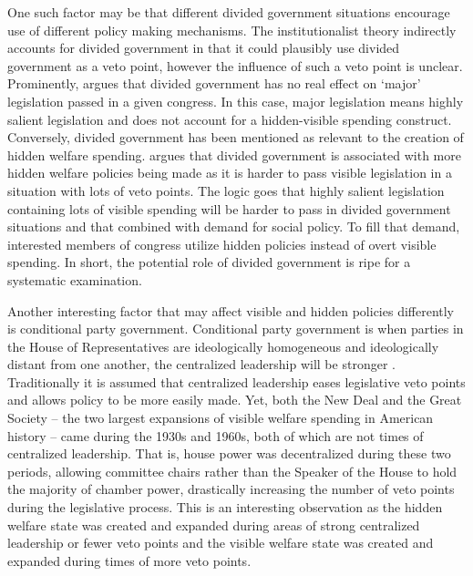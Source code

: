 \documentclass[12pt]{article}
\begin{document}
One such factor may be that different divided government situations encourage use of different policy making mechanisms.  The institutionalist theory indirectly accounts for divided government in that it could plausibly use divided government as a veto point, however the influence of such a veto point is unclear. Prominently, \cite{mayhew1990} argues that divided government has no real effect on `major' legislation passed in a given congress. In this case, major legislation means highly salient legislation and does not account for a hidden-visible spending construct. Conversely, divided government has been mentioned as relevant to the creation of hidden welfare spending. \citet[Ch. 4]{howard2008} argues that divided government is associated with more hidden welfare policies being made as it is harder to pass visible legislation in a situation with lots of veto points. The logic goes that highly salient legislation containing lots of visible spending will be harder to pass in divided government situations and that combined with demand for social policy. To fill that demand, interested members of congress utilize hidden policies instead of overt visible spending. In short, the potential role of divided government is ripe for a systematic examination.

Another interesting factor that may affect visible and hidden policies differently is conditional party government. Conditional party government is when parties in the House of Representatives are ideologically homogeneous and ideologically distant from one another, the centralized leadership will be stronger \cite{rohde1991}. Traditionally it is assumed that centralized leadership eases legislative veto points and allows policy to be more easily made. Yet, both the New Deal and the Great Society -- the two largest expansions of visible welfare spending in American history -- came during the 1930s and 1960s, both of which are not times of centralized leadership. That is, house power was decentralized during these two periods, allowing committee chairs rather than the Speaker of the House to hold the majority of chamber power, drastically increasing the number of veto points during the legislative process. This is an interesting observation as the hidden welfare state was created and expanded during areas of strong centralized leadership or fewer veto points and the visible welfare state was created and expanded during times of more veto points.
\end{document}
